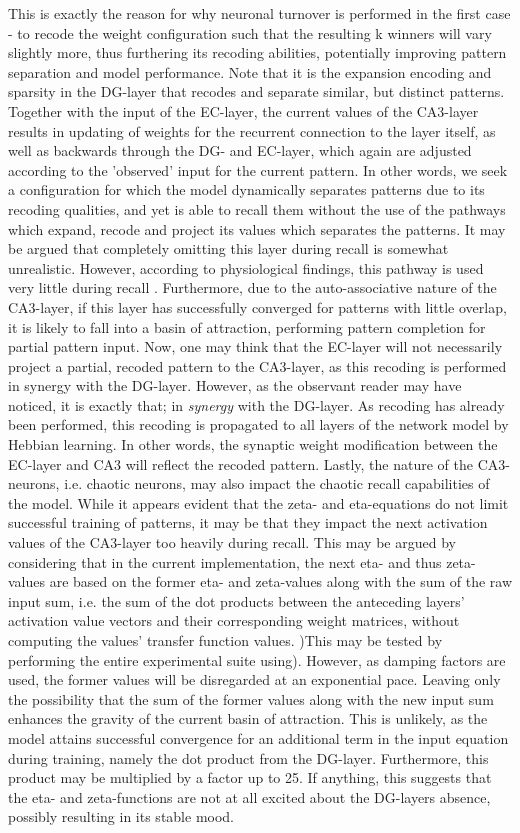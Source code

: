 This is exactly the reason for why neuronal turnover is performed in the first case - to recode the weight configuration such that the resulting k winners will vary slightly more, thus furthering its recoding abilities, potentially improving pattern separation and model performance. Note that it is the expansion encoding and sparsity in the DG-layer that recodes and separate similar, but distinct patterns. Together with the input of the EC-layer, the current values of the CA3-layer results in updating of weights for the recurrent connection to the layer itself, as well as backwards through the DG- and EC-layer, which again are adjusted according to the 'observed' input for the current pattern. In other words, we seek a configuration for which the model dynamically separates patterns due to its recoding qualities, and yet is able to recall them without the use of the pathways which expand, recode and project its values which separates the patterns. It may be argued that completely omitting this layer during recall is somewhat unrealistic. 
However, according to physiological findings, this pathway is used very little during recall \citep{Wakagi2008}. 
Furthermore, due to the auto-associative nature of the CA3-layer, if this layer has successfully converged for patterns with little overlap, it is likely to fall into a basin of attraction, performing pattern completion for partial pattern input. Now, one may think that the EC-layer will not necessarily project a partial, recoded pattern to the CA3-layer, as this recoding is performed in synergy with the DG-layer. However, as the observant reader may have noticed, it is exactly that; in \textit{synergy} with the DG-layer. As recoding has already been performed, this recoding is propagated to all layers of the network model by Hebbian learning. In other words, the synaptic weight modification between the EC-layer and CA3 will reflect the recoded pattern.
Lastly, the nature of the CA3-neurons, i.e. chaotic neurons, may also impact the chaotic recall capabilities of the model. While it appears evident that the zeta- and eta-equations do not limit successful training of patterns, it may be that they impact the next activation values of the CA3-layer too heavily during recall. This may be argued by considering that in the current implementation, the next eta- and thus zeta-values are based on the former eta- and zeta-values along with the sum of the raw input sum, i.e. the sum of the dot products between the anteceding layers' activation value vectors and their corresponding weight matrices, without computing the values' transfer function values. )This may be tested by performing the entire experimental suite using). However, as damping factors are used, the former values will be disregarded at an exponential pace. Leaving only the possibility that the sum of the former values along with the new input sum enhances the gravity of the current basin of attraction. This is unlikely, as the model attains successful convergence for an additional term in the input equation during training, namely the dot product from the DG-layer. Furthermore, this product may be multiplied by a factor up to 25. If anything, this suggests that the eta- and zeta-functions are not at all excited about the DG-layers absence, possibly resulting in its stable mood.



